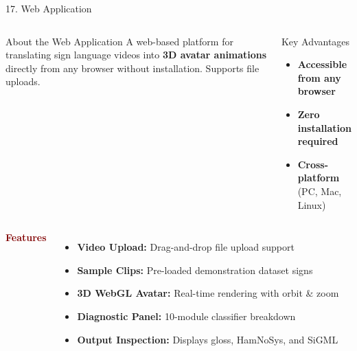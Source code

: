 \documentclass[aspectratio=169]{beamer}
\begin{document}
\begin{frame}[t]{17. Web Application}
\vspace{-0.1cm}

\begin{columns}[T]
\begin{block}{About the Web Application}
\fontsize{6.8pt}{8.8pt}\selectfont
A web-based platform for translating sign language videos into \textbf{3D avatar animations} directly from any browser without installation. Supports file uploads.
\end{block}

\begin{block}{Key Advantages}
\fontsize{6.8pt}{8.8pt}\selectfont
\begin{itemize}\setlength{\itemsep}{0.08cm}
\item[\textcolor{green!50!black}{\checkmark}] \textbf{Accessible from any browser}
\item[\textcolor{green!50!black}{\checkmark}] \textbf{Zero installation required}
\item[\textcolor{green!50!black}{\checkmark}] \textbf{Cross-platform} (PC, Mac, Linux)
\end{itemize}
\end{block}
\end{columns}

\vspace{0.18cm}

\begin{columns}[T]
\textbf{\textcolor{maroon}{\footnotesize Features}}
\vspace{0.05cm}
{\fontsize{6.4pt}{8.2pt}\selectfont
\begin{itemize}\setlength{\itemsep}{0.06cm}
\item \textbf{Video Upload:} Drag-and-drop file upload support
\item \textbf{Sample Clips:} Pre-loaded demonstration dataset signs
\item \textbf{3D WebGL Avatar:} Real-time rendering with orbit \& zoom
\item \textbf{Diagnostic Panel:} 10-module classifier breakdown
\item \textbf{Output Inspection:} Displays gloss, HamNoSys, and SiGML
\end{itemize}
}


\end{columns}
\end{frame}
\end{document}
